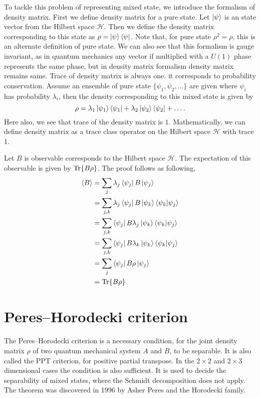\documentclass{amsart}
\theoremstyle{plain}
\theoremstyle{definition}
\theoremstyle{plain}
\begin{document}
To tackle this problem of representing mixed state, we introduce the formalism of density matrix. First we define density matrix for a pure state. Let $\ket{\psi}$ is an state vector from the Hilbert space $\mathcal{H}$. Then we define the density matrix corresponding to this state as $\rho = \ket{\psi} \bra{\psi}$. Note that, for pure state $\rho^2 = \rho$, this is an alternate definition of pure state. We can also see that this formalism is gauge invariant, as in quantum mechanics any vector if multiplied with a $U(1)$ phase represents the same phase, but in density matrix formalism density matrix remains same. Trace of density matrix is always one. it corresponds to probability conservation. Assume an ensemble of pure state $\{\psi_1, \psi_2, \dots\}$ are given where $\psi_i$ has probability $\lambda_i$, then the density corresponding to this mixed state is given by 
\begin{equation*}
    \rho = \lambda_1 \ket{\psi_1}\bra{\psi_1} + \lambda_2\ket{\psi_2}\bra{\psi_2} + \dots.
\end{equation*}
Here also, we see that trace of the density matrix is $1$. Mathematically, we can define density matrix as a trace class operator on the Hilbert space $\mathcal{H}$ with trace 1.


Let $B$ is observable corresponds to the Hilbert space $\mathcal{H}$. The expectation of this observable is given by $\Tr{B \rho}$. The proof follows as following,
\begin{align*}
    \langle B \rangle &= \sum_j \lambda_j \bra{\psi_j} B \ket{\psi_j} \\
    &= \sum_{j,k} \lambda_j \bra{\psi_j} B \ket{\psi_k} \bra{\psi_k} \ket{\psi_j} \\
    &= \sum_{j,k} \bra{\psi_j} B \lambda_j \ket{\psi_k} \bra{\psi_k} \ket{\psi_j} \\
    &= \sum_{j,k} \bra{\psi_j} B \lambda_k \ket{\psi_k} \bra{\psi_k} \ket{\psi_j} \\
    &= \sum_{j} \bra{\psi_j} B \rho \ket{\psi_j} \\
    &= \Tr{B \rho}
\end{align*}

\section{Peres–Horodecki criterion}
The Peres–Horodecki criterion is a necessary condition, for the joint density matrix $\rho$ of two quantum mechanical system $A$ and $B$, to be separable. It is also called the PPT criterion, for positive partial transpose. In the $2\times2$ and $2\times3$ dimensional cases the condition is also sufficient. It is used to decide the separability of mixed states, where the Schmidt decomposition does not apply. The theorem was discovered in 1996 by Asher Peres and the Horodecki family.
\end{document}
